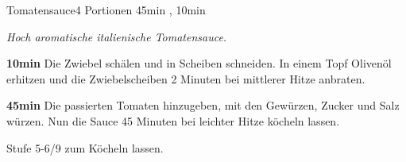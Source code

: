 \documentclass[../recipe-collections/cooking.tex]{subfiles}
\begin{document}
\begin{recipe}{Tomatensauce}{4 Portionen }{45min , 10min }

  \freeform{}\textit{Hoch aromatische italienische Tomatensauce.}


  \textbf{10min}
  Die Zwiebel schälen und in Scheiben schneiden.
  In einem Topf Olivenöl erhitzen und die Zwiebelscheiben 2 Minuten bei mittlerer Hitze anbraten.


  \textbf{45min}
  Die passierten Tomaten hinzugeben, mit den Gewürzen, Zucker und Salz würzen.
  Nun die Sauce 45 Minuten bei leichter Hitze köcheln lassen.

  \freeform{}\hrulefill{}

  \freeform{}
  Stufe 5-6/9 zum Köcheln lassen.

\end{recipe}
\end{document}
